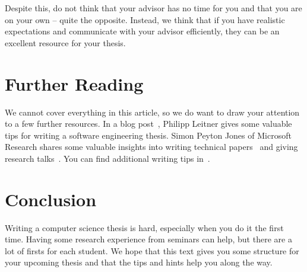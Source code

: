 \documentclass[a4paper]{article}
\begin{document}
Despite this, do not think that your advisor has no time for you and that you are on your own -- quite the opposite.
Instead, we think that if you have realistic expectations and communicate with your advisor efficiently, they can be an excellent resource for your thesis.

\section{Further Reading}
\label{sec:resources}

We cannot cover everything in this article, so we do want to draw your attention to a few further resources.
In a blog post~\cite{leitner}, Philipp Leitner gives some valuable tips for writing a software engineering thesis.
Simon Peyton Jones of Microsoft Research shares some valuable insights into writing technical papers~\cite{jones-paper} and giving research talks~\cite{jones-talk}.
You can find additional writing tips in~\cite{patterson-writing,ernst-writing,schulzrinne-writing}.

\section{Conclusion}
\label{sec:conclusion}

Writing a computer science thesis is hard, especially when you do it the first time.
Having some research experience from seminars can help, but there are a lot of firsts for each student.
We hope that this text gives you some structure for your upcoming thesis and that the tips and hints help you along the way.

\printbibliography
\end{document}
